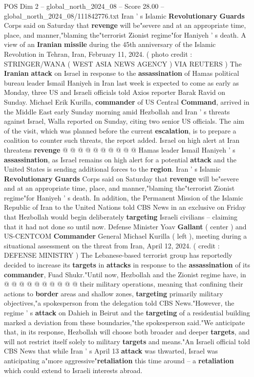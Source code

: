 \begin{textsample}{POS Dim 2 – global\_north\_2024\_08 – Score 28.00 – global\_north\_2024\_08/111842776.txt}  \label{ex:f2_pos_087}
Iran ' s Islamic \textbf{Revolutionary} \textbf{Guards} Corps said on Saturday that \textbf{revenge} will be"severe and at an appropriate time, place, and manner,"blaming the"terrorist Zionist regime"for Haniyeh ' s death.
A view of an \textbf{Iranian} \textbf{missile} during the 45th anniversary of the Islamic Revolution in Tehran, Iran, February 11, 2024. ( photo credit : STRINGER/WANA ( WEST ASIA NEWS AGENCY ) VIA REUTERS ) The \textbf{Iranian} \textbf{attack} on Israel in response to the \textbf{assassination} of Hamas political bureau leader Ismail Haniyeh in Iran last week is expected to come as early as Monday, three US and Israeli officials told Axios reporter Barak Ravid on Sunday.
Michael Erik Kurilla, \textbf{commander} of US Central \textbf{Command}, arrived in the Middle East early Sunday morning amid Hezbollah and Iran ' s threats against Israel, Walla reported on Sunday, citing two senior US officials.
The aim of the visit, which was planned before the current \textbf{escalation}, is to prepare a coalition to counter such threats, the report added.
Israel on high alert at Iran threatens \textbf{revenge} @ @ @ @ @ @ @ @ @ @ Hamas leader Ismail Haniyeh ' s \textbf{assassination}, as Israel remains on high alert for a potential \textbf{attack} and the United States is sending additional forces to the \textbf{region}.
Iran ' s Islamic \textbf{Revolutionary} \textbf{Guards} Corps said on Saturday that \textbf{revenge} will be"severe and at an appropriate time, place, and manner,"blaming the"terrorist Zionist regime"for Haniyeh ' s death.
In addition, the Permanent Mission of the Islamic Republic of Iran to the United Nations told CBS News in an exclusive on Friday that Hezbollah would begin deliberately \textbf{targeting} Israeli civilians -- claiming that it had not done so until now.
Defense Minister Yoav \textbf{Gallant} ( center ) and US-CENTCOM \textbf{Commander} General Michael Kurilla ( left ), meeting during a situational assessment on the threat from Iran, April 12, 2024. ( credit : DEFENSE MINISTRY ) The Lebanese-based terrorist group has reportedly decided to increase its \textbf{targets} in \textbf{attacks} in response to the \textbf{assassination} of its \textbf{commander}, Fuad Shukr."Until now, Hezbollah and the Zionist regime have, in @ @ @ @ @ @ @ @ @ @ their military operations, meaning that confining their actions to \textbf{border} areas and shallow zones, \textbf{targeting} primarily military objectives,"a spokesperson from the delegation told CBS News."However, the regime ' s \textbf{attack} on Dahieh in Beirut and the \textbf{targeting} of a residential building marked a deviation from these boundaries,"the spokesperson said."We anticipate that, in its response, Hezbollah will choose both broader and deeper \textbf{targets}, and will not restrict itself solely to military \textbf{targets} and means."An Israeli official told CBS News that while Iran ' s April 13 \textbf{attack} was thwarted, Israel was anticipating a"more aggressive"\textbf{retaliation} this time around -- a \textbf{retaliation} which could extend to Israeli interests abroad.

\end{textsample}
